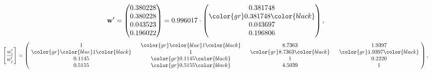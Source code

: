 \begin{example}
\begin{equation*}
\mathbf{w}^{\prime} =
\begin{pmatrix}
0.380228\\
0.380228\\
0.043523\\
0.196022
\end{pmatrix} =
0.996017\cdot
\begin{pmatrix}
0.381748\\
\color{gr} 0.381748\color{black} \\
0.043697\\
0.196806
\end{pmatrix},
\end{equation*}
\begin{equation*}
\left[ \frac{{w}^{\prime}_i}{{w}^{\prime}_j} \right] =
\begin{pmatrix}
$\,\,$ 1 $\,\,$ & $\,\,$\color{gr} \color{blue} 1\color{black} $\,\,$ & $\,\,$8.7363$\,\,$ & $\,\,$1.9397$\,\,$ \\
$\,\,$\color{gr} \color{blue} 1\color{black} $\,\,$ & $\,\,$ 1 $\,\,$ & $\,\,$\color{gr} 8.7363\color{black} $\,\,$ & $\,\,$\color{gr} 1.9397\color{black}   $\,\,$ \\
$\,\,$0.1145$\,\,$ & $\,\,$\color{gr} 0.1145\color{black} $\,\,$ & $\,\,$ 1 $\,\,$ & $\,\,$0.2220 $\,\,$ \\
$\,\,$0.5155$\,\,$ & $\,\,$\color{gr} 0.5155\color{black} $\,\,$ & $\,\,$4.5039$\,\,$ & $\,\,$ 1  $\,\,$ \\
\end{pmatrix},
\end{equation*}
\end{example}
\newpage
